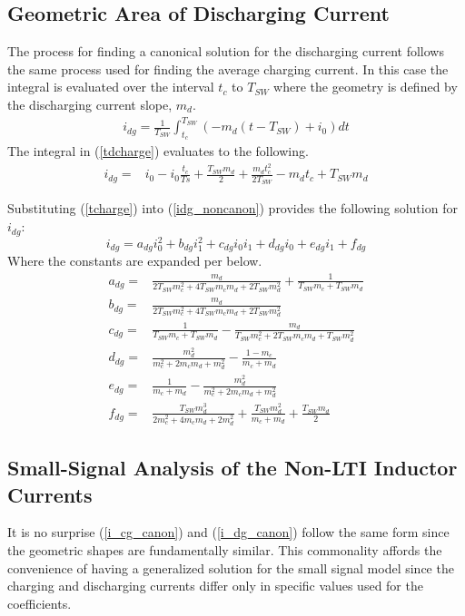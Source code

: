 \documentclass[conference]{IEEEtran}
\begin{document}
\subsection{Geometric Area of Discharging Current}
The process for finding a canonical solution for the discharging current follows the same process used for finding the average charging current. In this case the integral is evaluated over the interval $t_c$ to $T_{SW}$ where the geometry is defined by the discharging current slope, $m_d$.
\begin{align}
i_{dg} = \frac{1}{T_{SW}}\int_{t_c}^{T_{SW}}(-m_d(t-T_{SW})+i_0)dt
\label{tdcharge}
\end{align}
The integral in (\ref{tdcharge}) evaluates to the following.
\begin{align}
i_{dg} = & i_0-i_0\frac{t_c}{Ts}+\frac{T_{SW}m_d}{2}+\frac{m_dt_c^2}{2T_{SW}}-m_dt_c+T_{SW}m_d
\label{idg_noncanon}
\end{align}

Substituting (\ref{tcharge}) into (\ref{idg_noncanon}) provides the following solution for \(i_{dg}\):
\begin{equation}
i_{dg} = a_{dg}i_0^2+b_{dg}i_1^2+c_{dg}i_0i_1+d_{dg}i_0+e_{dg}i_1+f_{dg} \label{i_dg_canon}
\end{equation}
Where the constants are expanded per below.
\begin{align*}
a_{dg} = & \frac{m_d}{2T_{SW}m_c^2+4T_{SW}m_cm_d+2T_{SW}m_d^2}+\frac{1}{T_{SW}m_c+T_{SW}m_d}\nonumber\\
b_{dg} = & \frac{m_d}{2T_{SW}m_c^2+4T_{SW}m_cm_d+2T_{SW}m_d^2}\nonumber\\
c_{dg} = & \frac{1}{T_{SW}m_c+T_{SW}m_d}-\frac{m_d}{T_{SW}m_c^2+2T_{SW}m_cm_d+T_{SW}m_d^2}\nonumber\\
d_{dg} = & \frac{m_d^2}{m_c^2+2m_cm_d+m_d^2}-\frac{1-m_c}{m_c+m_d}\nonumber\\
e_{dg} = & \frac{1}{m_c+m_d}-\frac{m_d^2}{m_c^2+2m_cm_d+m_d^2}\nonumber\\
f_{dg} = & \frac{T_{SW}m_d^3}{2m_c^2+4m_cm_d+2m_d^2}+\frac{T_{SW}m_d^2}{m_c+m_d}+\frac{T_{SW}m_d}{2}
\end{align*}

\subsection{Small-Signal Analysis of the Non-LTI Inductor Currents}
It is no surprise (\ref{i_cg_canon}) and (\ref{i_dg_canon}) follow the same form since the geometric shapes are fundamentally similar. This commonality affords the convenience of having a generalized solution for the small signal model since the charging and discharging currents differ only in specific values used for the coefficients.
\end{document}
